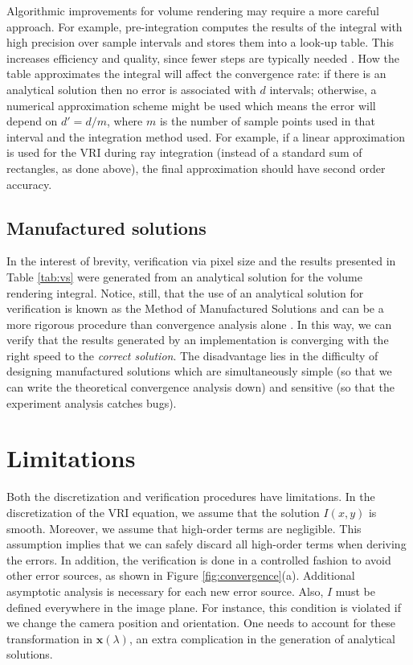 Algorithmic improvements for volume rendering may require a more
careful approach. For example, pre-integration computes the results of
the integral with high precision over sample intervals and stores them
into a look-up table. This increases efficiency and quality, since
fewer steps are typically needed \cite{Engel01}. How the table
approximates the integral will affect the convergence rate: if there
is an analytical solution then no error is associated with $d$
intervals; otherwise, a numerical approximation scheme might be used
which means the error will depend on $d' = d / m$, where $m$ is the
number of sample points used in that interval and the integration
method used. For example, if a linear approximation is used for the
VRI during ray integration (instead of a standard sum of rectangles,
as done above), the final approximation should have second order
accuracy.

\subsection{Manufactured solutions}
%
In the interest of brevity, verification via pixel size and the
results presented in Table \ref{tab:vs} were generated from an
analytical solution for the volume rendering integral. Notice, still,
that the use of an analytical solution for verification is known as
the Method of Manufactured Solutions \cite{babuska04} and can be a
more rigorous procedure than convergence analysis alone
\cite{Roy2005}. In this way, we can verify that the results generated
by an implementation is converging with the right speed to the
\emph{correct solution}. The disadvantage lies in the difficulty of
designing manufactured solutions which are simultaneously simple (so
that we can write the theoretical convergence analysis down) and
sensitive (so that the experiment analysis catches bugs).

\section{Limitations}
\label{sec:limitations}
 
Both the discretization and verification procedures have
limitations. In the discretization of the VRI equation, we assume that
the solution $I(x,y)$ is smooth. Moreover, we assume that high-order
terms are negligible. This assumption implies that we can safely
discard all high-order terms when deriving the errors.  In addition,
the verification is done in a controlled fashion to avoid other error
sources, as shown in 
Figure \ref{fig:convergence}(a). Additional asymptotic analysis 
is necessary for each new error source. Also, $I$ must
be defined everywhere in the image plane. For instance, this condition
is violated if we change the camera position and orientation. One
needs to account for these transformation in $\mathbf{x}(\lambda)$, an
extra complication in the generation of analytical solutions.

